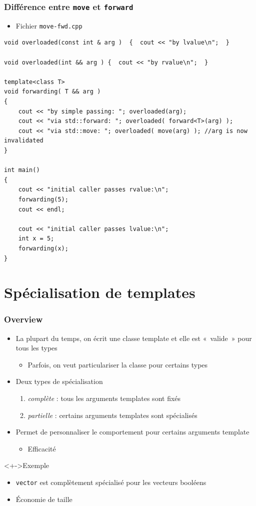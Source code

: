 \begin{frame}[containsverbatim]
\frametitle{Différence entre \texttt{move} et \texttt{forward}}
\begin{itemize}
\item Fichier \texttt{move-fwd.cpp}
\end{itemize}
\begin{lstlisting}
void overloaded(const int & arg )  {  cout << "by lvalue\n";  }

void overloaded(int && arg ) {  cout << "by rvalue\n";  }
     
template<class T>
void forwarding( T && arg ) 
{
	cout << "by simple passing: "; overloaded(arg);
	cout << "via std::forward: "; overloaded( forward<T>(arg) );
	cout << "via std::move: "; overloaded( move(arg) ); //arg is now invalidated	
}

int main() 
{
	cout << "initial caller passes rvalue:\n";
	forwarding(5);
	cout << endl;

	cout << "initial caller passes lvalue:\n";
	int x = 5;
	forwarding(x);
}
\end{lstlisting}
\end{frame}

\section[Spécialisation]{Spécialisation de templates}

\begin{frame}
\frametitle{Overview}
\begin{itemize}[<+->]
\item La plupart du temps, on écrit une classe template et elle est «~valide~» pour tous les types
	\begin{itemize}
	\item Parfois, on veut particulariser la classe pour certains types
	\end{itemize}
\item Deux types de spécialisation
	\begin{enumerate}
	\item \emph{complète} : tous les arguments templates sont fixés
	\item \emph{partielle} : certains arguments templates sont spécialisés
	\end{enumerate}
\item Permet de personnaliser le comportement pour certains arguments template
	\begin{itemize}
	\item Efficacité
	\end{itemize}
\end{itemize}
\begin{exampleblock}<+->{Exemple}
	\begin{itemize}[<+->]
	\item \texttt{vector} est complètement spécialisé pour les vecteurs booléens
	\item Économie de taille
	\end{itemize}
\end{exampleblock}
\end{frame}

